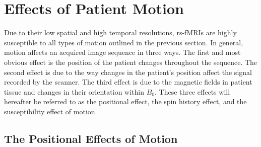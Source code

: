 


\section{Effects of Patient Motion}

Due to their low spatial and high temporal resolutions, rs-fMRIs are highly susceptible to all types of motion outlined in the previous section. In general, motion affects an acquired image sequence in three ways. The first and most obvious effect is the position of the patient changes throughout the sequence. The second effect is due to the way changes in the patient's position affect the signal recorded by the scanner. The third effect is due to the magnetic fields in patient tissue and changes in their orientation within $B_0$. These three effects will hereafter be referred to as the positional effect, the spin history effect, and the susceptibility effect of motion.

\subsection{The Positional Effects of Motion}

